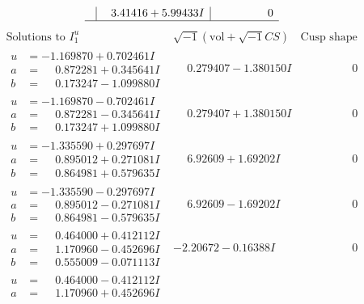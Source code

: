 \documentclass[1p]{elsarticle_modified}
\theoremstyle{definition}
\newcommand{\I}{\sqrt{-1}}
\begin{document}
$$\begin{array}{c|c|c}
 & \phantom{-}3.41416 + 5.99433 I & \phantom{-0.000000 } 0\\
 \hline 
 \end{array}$$\newpage$$\begin{array}{c|c|c}  
\text{Solutions to }I^u_{1}& \I (\text{vol} + \sqrt{-1}CS) & \text{Cusp shape}\\
 \hline 
\begin{aligned}
u &= -1.169870 + 0.702461 I \\
a &= \phantom{-}0.872281 + 0.345641 I \\
b &= \phantom{-}0.173247 - 1.099880 I\end{aligned}
 & \phantom{-}0.279407 - 1.380150 I & \phantom{-0.000000 } 0 \\ \hline\begin{aligned}
u &= -1.169870 - 0.702461 I \\
a &= \phantom{-}0.872281 - 0.345641 I \\
b &= \phantom{-}0.173247 + 1.099880 I\end{aligned}
 & \phantom{-}0.279407 + 1.380150 I & \phantom{-0.000000 } 0 \\ \hline\begin{aligned}
u &= -1.335590 + 0.297697 I \\
a &= \phantom{-}0.895012 + 0.271081 I \\
b &= \phantom{-}0.864981 + 0.579635 I\end{aligned}
 & \phantom{-}6.92609 + 1.69202 I & \phantom{-0.000000 } 0 \\ \hline\begin{aligned}
u &= -1.335590 - 0.297697 I \\
a &= \phantom{-}0.895012 - 0.271081 I \\
b &= \phantom{-}0.864981 - 0.579635 I\end{aligned}
 & \phantom{-}6.92609 - 1.69202 I & \phantom{-0.000000 } 0 \\ \hline\begin{aligned}
u &= \phantom{-}0.464000 + 0.412112 I \\
a &= \phantom{-}1.170960 - 0.452696 I \\
b &= \phantom{-}0.555009 - 0.071113 I\end{aligned}
 & -2.20672 - 0.16388 I & \phantom{-0.000000 } 0 \\ \hline\begin{aligned}
u &= \phantom{-}0.464000 - 0.412112 I \\
a &= \phantom{-}1.170960 + 0.452696 I \\

\end{aligned}
\end{array}$$
\end{document}
